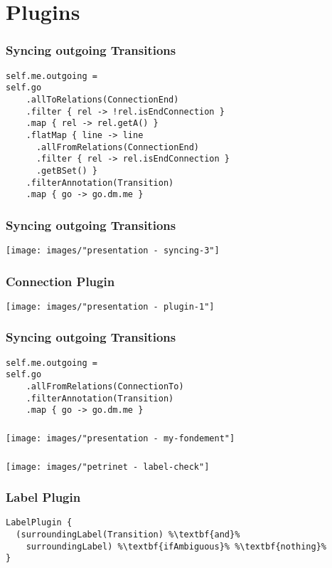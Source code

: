 \section*{Plugins}
\begin{frame}[fragile]
  \frametitle{Syncing outgoing Transitions}
  \vspace*{-1cm}
  \begin{lstlisting}
self.me.outgoing = 
self.go
    .allToRelations(ConnectionEnd)
    .filter { rel -> !rel.isEndConnection }
    .map { rel -> rel.getA() }
    .flatMap { line -> line
      .allFromRelations(ConnectionEnd)
      .filter { rel -> rel.isEndConnection }
      .getBSet() }
    .filterAnnotation(Transition)
    .map { go -> go.dm.me }
  \end{lstlisting}
\end{frame}

\begin{frame}
  \frametitle{Syncing outgoing Transitions}
  \hspace{-1cm}
  \texttt{[image: images/"presentation - syncing-3"]}
\end{frame}

\begin{frame}
  \centering
  \hspace{-1cm}
  \huge
\end{frame}

\begin{frame}
  \frametitle{Connection Plugin}
  \hspace{-1cm}
  \texttt{[image: images/"presentation - plugin-1"]}
\end{frame}

\begin{frame}[fragile]
  \frametitle{Syncing outgoing Transitions}
\vspace*{-1cm}
  \begin{lstlisting}
self.me.outgoing = 
self.go
    .allFromRelations(ConnectionTo)
    .filterAnnotation(Transition)
    .map { go -> go.dm.me }
  \end{lstlisting}
\end{frame}

\begin{frame}
  \frametitle{}
  \hspace{-1cm}
  \texttt{[image: images/"presentation - my-fondement"]}
\end{frame}


\begin{frame}
  \frametitle{}
  \centering
  \hspace{-1cm}
  \texttt{[image: images/"petrinet - label-check"]}
\end{frame}

\begin{frame}[fragile]
  \frametitle{Label Plugin}
  \vspace*{-1cm}
  \begin{lstlisting}[escapechar=\%]
LabelPlugin {
  (surroundingLabel(Transition) %\textbf{and}%
    surroundingLabel) %\textbf{ifAmbiguous}% %\textbf{nothing}%
}
  \end{lstlisting}  
\end{frame}
